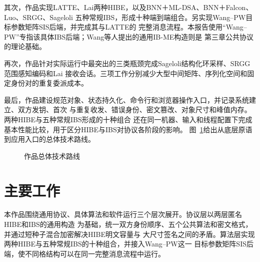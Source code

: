 其次，作品实现LATTE、Lai两种HIBE，以及BNN＋ML-DSA、BNN＋Falcon、Luo、SRGG、Sageloli
五种常规IBS，形成十种端到端组合。另实现Wang--PW目标参数矩阵SIS后端，并完成其与LATTE的
完整消息流程。本报告使用“Wang--PW”专指该具体IBS后端；Wang等人提出的通用IB-ME构造则是
第三章公共协议的理论基础。

再次，作品针对实际运行中最突出的三类瓶颈完成Sageloli结构化环采样、SRGG范围感知编码和Lai
接收会话。三项工作分别减少大型中间矩阵、序列化空间和固定身份对的重复委派成本。

最后，作品建设规范对象、状态持久化、命令行和浏览器操作入口，并记录系统建立、双方发钥、首次
与重复收发、错误身份、密文篡改、对象尺寸和峰值内存。两种HIBE与五种常规IBS形成的十种组合
还在同一机器、输入和线程配置下完成基本性能比较，用于区分HIBE与IBS对协议各阶段的影响。
图~\ref{fig:work-overview}给出从底层原语到应用入口的总体技术路线。

\begin{figure}[H]
\centering
{}
\caption{作品总体技术路线}
\label{fig:work-overview}
\end{figure}

\section{主要工作}

本作品围绕通用协议、具体算法和软件运行三个层次展开。协议层以两层匿名HIBE和IBS的通用构造
为基础，统一双方身份顺序、五个公共算法和密文格式，并通过短种子混合加密解决HIBE明文容量与
大尺寸签名之间的矛盾。算法层实现两种HIBE与五种常规IBS的十种组合，并接入Wang--PW这一
目标参数矩阵SIS后端，使不同格结构可以在同一完整消息流程中运行。

